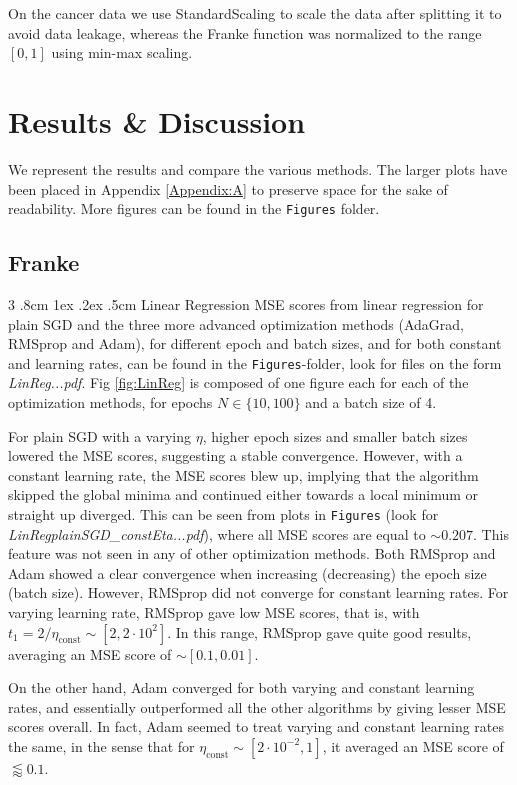 \documentclass[%
reprint,s
amsmath,amssymb,
aps,
]{revtex4-2}
\makeatletter
\renewcommand{\subsubsection}{%
	\@startsection
	{subsubsection}%
	{3}%
	{\z@}%
	{.8cm \@plus1ex \@minus .2ex}%
	{.5cm}%
	{\normalfont\small\centering}%
}
\makeatother
\begin{document}
On the cancer data we use StandardScaling to scale the data after splitting it to avoid data leakage, whereas the Franke function was normalized to the range $[0,1]$ using min-max scaling.


\section{Results \& Discussion}
We represent the results and compare the various methods. The larger plots have been placed in Appendix \ref{Appendix:A} to preserve space for the sake of readability. More figures can be found in the \texttt{Figures} folder.

\subsection{Franke}
\subsubsection{Linear Regression}
MSE scores from linear regression for plain SGD and the three more advanced optimization methods (AdaGrad, RMSprop and Adam), for different epoch and batch sizes, and for both constant and learning rates, can be found in the \texttt{Figures}-folder, look for files on the form \emph{LinReg...pdf}. Fig \ref{fig:LinReg} is composed of one figure each for each of the optimization methods, for epochs \(N\in\{10, 100\}\) and a batch size of 4. 

For plain SGD with a varying \(\eta\), higher epoch sizes and smaller batch sizes lowered the MSE scores, suggesting a stable convergence. However, with a constant learning rate, the MSE scores blew up, implying that the algorithm skipped the global minima and continued either towards a local minimum or straight up diverged. This can be seen from plots in \texttt{Figures} (look for \emph{LinRegplainSGD\_constEta...pdf}), where all MSE scores are equal to \(\sim 0.207\). This feature was not seen in any of other optimization methods. Both RMSprop and Adam showed a clear convergence when increasing (decreasing) the epoch size (batch size). However, RMSprop did not converge for constant learning rates. For varying learning rate, RMSprop gave low MSE scores, that is, with \(t_{1} = 2/\eta_{\text{const}}\sim [2, 2\cdot 10^{2}]\). In this range, RMSprop gave quite good results, averaging an MSE score of \(\sim [0.1, 0.01]\). 

On the other hand, Adam converged for both varying and constant learning rates, and essentially outperformed all the other algorithms by giving lesser MSE scores overall. In fact, Adam seemed to treat varying and constant learning rates the same, in the sense that for \(\eta_{\text{const}}\sim[2\cdot10^{-2}, 1]\), it averaged an MSE score of \(\lessapprox 0.1\).
\end{document}
